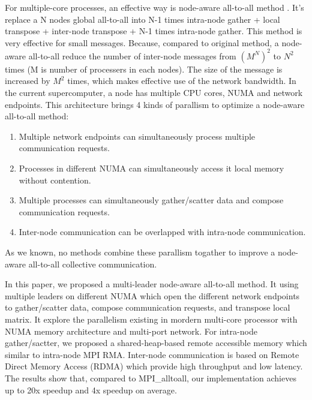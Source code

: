 For multiple-core processes, an effective way is node-aware all-to-all method \cite{sistare1999optimization}.
It's replace a N nodes global all-to-all into N-1 times intra-node gather + local transpose + inter-node transpose + N-1 times intra-node gather.
This method is very effective for small messages.
Because, compared to original method, a node-aware all-to-all reduce the number of inter-node messages from $(M^N)^2$ to $N^2$ times (M is number of processers in each nodes).
The size of the message is increased by $M^2$ times, which makes effective use of the network bandwidth.
In the current supercomputer, a node has multiple CPU cores, NUMA and network endpoints.
This architecture brings 4 kinds of parallism to optimize a node-aware all-to-all method:
\begin{enumerate}[(1)]
\item Multiple network endpoints can simultaneously process multiple communication requests.
\item Processes in different NUMA can simultaneously access it local memory without contention.
\item Multiple processes can simultaneously gather/scatter data and compose communication requests.
\item Inter-node communication can be overlapped with intra-node communication.
\end{enumerate}
As we known, no methods combine these parallism togather to improve a node-aware all-to-all collective communication. 


In this paper, we proposed a multi-leader node-aware all-to-all method.
It using multiple leaders on different NUMA which open the different network endpoints to gather/scatter data, compose communication requests, and transpose local matrix.
It explore the parallelism existing in mordern multi-core processor with NUMA memory architecture and multi-port network.
For intra-node gather/sactter, we proposed a shared-heap-based remote accessible memory which similar to intra-node MPI RMA.
Inter-node communication is based on Remote Direct Memory Access (RDMA) which provide high throughput and low latency.
The results show that, compared to MPI\_alltoall, our implementation achieves up to 20x speedup and 4x speedup on average. 